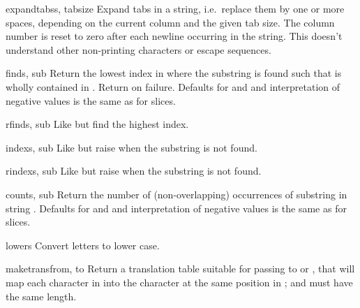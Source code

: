 \begin{funcdesc}{expandtabs}{s, tabsize}
Expand tabs in a string, i.e.\ replace them by one or more spaces,
depending on the current column and the given tab size.  The column
number is reset to zero after each newline occurring in the string.
This doesn't understand other non-printing characters or escape
sequences.
\end{funcdesc}

\begin{funcdesc}{find}{s, sub}
Return the lowest index in  where the substring  is
found such that  is wholly contained in
.  Return  on failure.
Defaults for  and  and interpretation of negative
values is the same as for slices.
\end{funcdesc}

\begin{funcdesc}{rfind}{s, sub}
Like  but find the highest index.
\end{funcdesc}

\begin{funcdesc}{index}{s, sub}
Like  but raise  when the
substring is not found.
\end{funcdesc}

\begin{funcdesc}{rindex}{s, sub}
Like  but raise  when the
substring is not found.
\end{funcdesc}

\begin{funcdesc}{count}{s, sub}
Return the number of (non-overlapping) occurrences of substring
 in string .
Defaults for  and  and interpretation of negative
values is the same as for slices.
\end{funcdesc}

\begin{funcdesc}{lower}{s}
Convert letters to lower case.
\end{funcdesc}

\begin{funcdesc}{maketrans}{from, to}
Return a translation table suitable for passing to
 or , that will map
each character in  into the character at the same position
in ;  and  must have the same length. 
\end{funcdesc}

